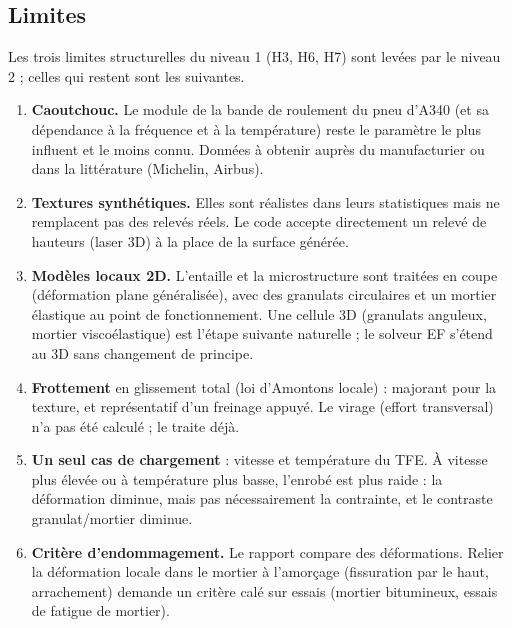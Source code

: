 \subsection{Limites}
Les trois limites structurelles du niveau 1 (H3, H6, H7) sont levées par le niveau 2 ; celles qui
restent sont les suivantes.
\begin{enumerate}[nosep]
\item \textbf{Caoutchouc.} Le module de la bande de roulement du pneu d'A340 (et sa
      dépendance à la fréquence et à la température) reste le paramètre le plus influent et le
      moins connu. Données à obtenir auprès du manufacturier ou dans la littérature (Michelin,
      Airbus).
\item \textbf{Textures synthétiques.} Elles sont réalistes dans leurs statistiques mais ne
      remplacent pas des relevés réels. Le code accepte directement un relevé de hauteurs (laser
      3D) à la place de la surface générée.
\item \textbf{Modèles locaux 2D.} L'entaille et la microstructure sont traitées en coupe
      (déformation plane généralisée), avec des granulats circulaires et un mortier élastique au
      point de fonctionnement. Une cellule 3D (granulats anguleux, mortier viscoélastique) est
      l'étape suivante naturelle ; le solveur EF s'étend au 3D sans changement de principe.
\item \textbf{Frottement} en glissement total (loi d'Amontons locale) : majorant pour la
      texture, et représentatif d'un freinage appuyé. Le virage (effort transversal) n'a pas été
      calculé ; \cs{} le traite déjà.
\item \textbf{Un seul cas de chargement} : vitesse et température du TFE. À vitesse plus élevée
      ou à température plus basse, l'enrobé est plus raide : la déformation diminue, mais pas
      nécessairement la contrainte, et le contraste granulat/mortier diminue.
\item \textbf{Critère d'endommagement.} Le rapport compare des déformations. Relier la
      déformation locale dans le mortier à l'amorçage (fissuration par le haut, arrachement)
      demande un critère calé sur essais (mortier bitumineux, essais de fatigue de mortier).
\end{enumerate}

